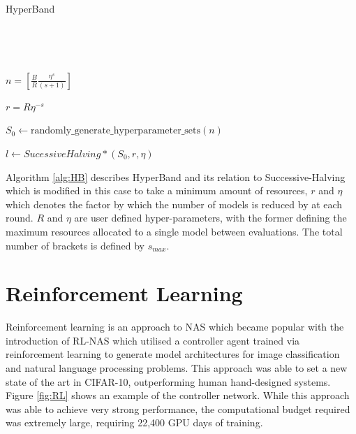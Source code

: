 \documentclass{article}
\begin{document}
		\begin{algorithm}[H]\label{alg:HB}
			\caption{HyperBand}

			\SetAlgoLined
			\
			
			\



				{
				\(n = \left[ \frac{B}{R}\frac{\eta^s}{(s+1)} \right]\)\;

				\(r = R\eta^{-s}\)\;

				\(S_0 \leftarrow \text{randomly\_generate\_hyperparameter\_sets}(n)\)\;

				\(l \leftarrow SucessiveHalving*(S_0,r,\eta)\)\;

				}

		\end{algorithm}

		Algorithm \ref{alg:HB} describes HyperBand and its relation to Successive-Halving which is modified in this case to take a minimum amount of resources, \(r\) and \(\eta\) which denotes the factor by which the number of models is reduced by at each round. \(R\) and \(\eta\) are user defined hyper-parameters, with the former defining the maximum resources allocated to a single model between evaluations. The total number of brackets is defined by \(s_{max}\). 


\section{Reinforcement Learning}

	Reinforcement learning is an approach to NAS which became popular with the introduction of RL-NAS \cite{NAS-RL} which utilised a controller agent trained via reinforcement learning to generate model architectures for image classification and natural language processing problems. This approach was able to set a new state of the art in CIFAR-10, outperforming human hand-designed systems. Figure \ref{fig:RL} shows an example of the controller network. While this approach was able to achieve very strong performance, the computational budget required was extremely large, requiring 22,400 GPU days of training. 
 
\end{document}
